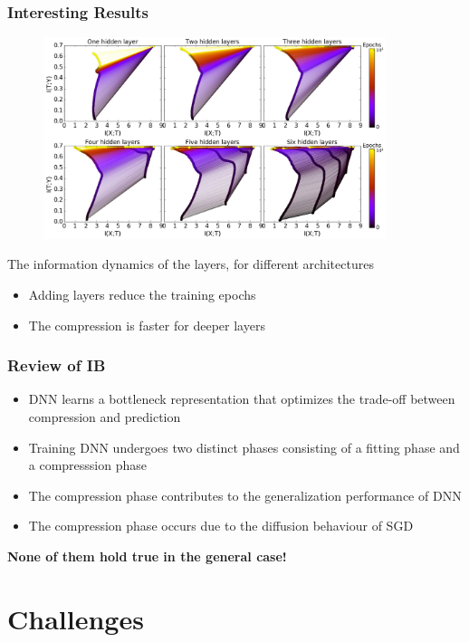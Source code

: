 \documentclass{beamer}
\begin{document}
\begin{frame}
    \frametitle{Interesting Results}
    \vspace{-0.25cm}
    \begin{figure}
        \centering
        \includegraphics[width=10cm]{info_plane_layers.jpg}
    \end{figure}
    \vspace{-0.4cm}
    The information dynamics of the layers, for different architectures
    \begin{itemize}
        \item Adding layers reduce the training epochs
        \item The compression is faster for deeper layers
    \end{itemize}
\end{frame}

\begin{frame}
    \frametitle{Review of IB}
    \begin{itemize}
        \item DNN learns a bottleneck representation that optimizes the trade-off between compression and prediction
        \item Training DNN undergoes two distinct phases consisting of a fitting phase and a compresssion phase
        \item The compression phase contributes to the generalization performance of DNN
        \item The compression phase occurs due to the diffusion behaviour of SGD
    \end{itemize}
    \vspace{1cm}
    \centering
    \pause \textbf{None of them hold true in the general case!} \cite{IB-challenge}

\end{frame}

\section{Challenges}
\end{document}
